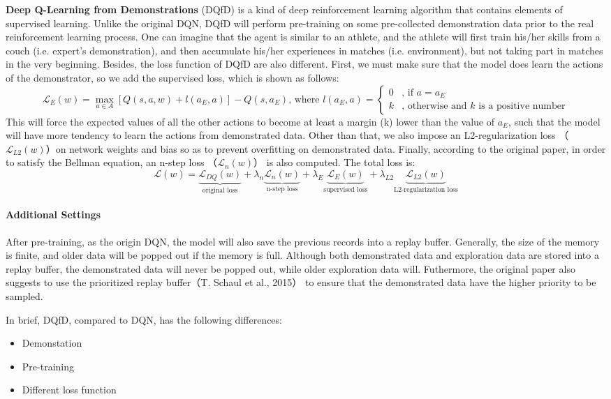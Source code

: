 \documentclass[a0,portrait]{a0poster}
\begin{document}
\begin{multicols}{2}
\textbf{Deep Q-Learning from Demonstrations} (DQfD) is a kind of deep reinforcement learning algorithm that contains elements of supervised learning. Unlike the original DQN, DQfD will perform pre-training on some pre-collected demonstration data prior to the real reinforcement learning process. One can imagine that the agent is similar to an athlete, and the athlete will first train his/her skills from a couch (i.e. expert's demonstration), and then accumulate his/her experiences in matches (i.e. environment), but not taking part in matches in the very beginning. Besides, the loss function of DQfD are also different. First, we must make sure that the model does learn the actions of the demonstrator, so we add the supervised loss, which is shown as follows:
\[\mathcal{L}_E(w) = \underset{a \in A}\max [Q(s,a,w) + l(a_E, a)] - Q(s, a_E)\text{, where }l(a_E, a) = \left\{\begin{array}{cl}0 & \text{, if } a = a_E\\ k & \text{, otherwise and } k \text{ is a positive number}\end{array}\right.\]
This will force the expected values of all the other actions to become at least a margin (k) lower than the value of $a_E$, such that the model will have more tendency to learn the actions from demonstrated data. Other than that, we also impose an L2-regularization loss （$\mathcal{L}_{L2}(w)$）on network weights and bias so as to prevent overfitting on demonstrated data. Finally, according to the original paper, in order to satisfy the Bellman equation, an n-step loss （$\mathcal{L}_n(w)$） is also computed. The total loss is:
\[\mathcal{L}(w) = \underbrace{\mathcal{L}_{DQ}(w)}_{\text{original loss}} + \lambda_n \underbrace{\mathcal{L}_{n}(w)}_{\text{n-step loss}} + \lambda_E \underbrace{\mathcal{L}_{E}(w)}_{\text{supervised loss}} + \lambda_{L2} \underbrace{\mathcal{L}_{L2}(w)}_{\text{L2-regularization loss}}\]

\paragraph{Additional Settings} After pre-training, as the origin DQN, the model will also save the previous records into a replay buffer. Generally, the size of the memory is finite, and older data will be popped out if the memory is full. Although both demonstrated data and exploration data are stored into a replay buffer, the demonstrated data will never be popped out, while older exploration data will. Futhermore, the original paper also suggests to use the prioritized replay buffer（T. Schaul et al., 2015） \cite{DBLP:journals/corr/SchaulQAS15} to ensure that the demonstrated data have the higher priority to be sampled. \par
In brief, DQfD, compared to DQN, has the following differences:
\begin{itemize}
    \item Demonstation
    \item Pre-training
    \item Different loss function
\end{itemize}


\end{multicols}
\end{document}
